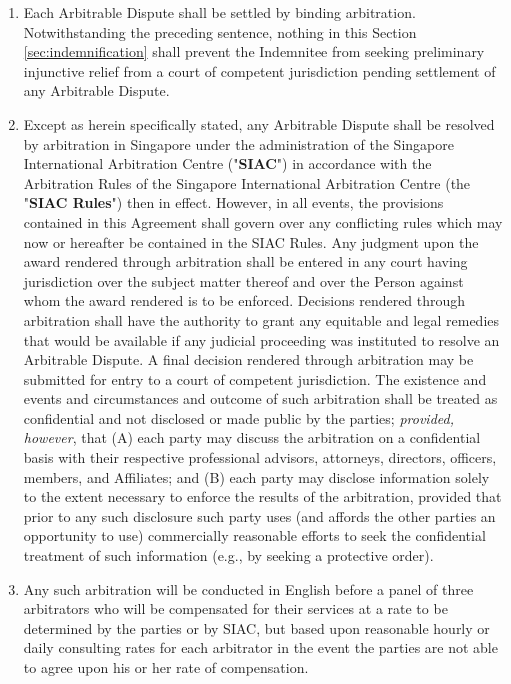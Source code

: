 \documentclass{article}
\begin{document}
\begin{enumerate}
\begin{enumerate}
              \item Each Arbitrable Dispute shall be settled by binding arbitration. Notwithstanding the preceding sentence, nothing in this Section \ref{sec:indemnification} shall prevent the Indemnitee from seeking preliminary injunctive relief from a court of competent jurisdiction pending settlement of any Arbitrable Dispute.

              \item Except as herein specifically stated, any Arbitrable Dispute shall be resolved by arbitration in Singapore under the administration of the Singapore International Arbitration Centre ("\textbf{SIAC}") in accordance with the Arbitration Rules of the Singapore International Arbitration Centre (the "\textbf{SIAC Rules}") then in effect. However, in all events, the provisions contained in this Agreement shall govern over any conflicting rules which may now or hereafter be contained in the SIAC Rules. Any judgment upon the award rendered through arbitration shall be entered in any court having jurisdiction over the subject matter thereof and over the Person against whom the award rendered is to be enforced. Decisions rendered through arbitration shall have the authority to grant any equitable and legal remedies that would be available if any judicial proceeding was instituted to resolve an Arbitrable Dispute. A final decision rendered through arbitration may be submitted for entry to a court of competent jurisdiction. The existence and events and circumstances and outcome of such arbitration shall be treated as confidential and not disclosed or made public by the parties; \textit{provided, however}, that (A) each party may discuss the arbitration on a confidential basis with their respective professional advisors, attorneys, directors, officers, members, and Affiliates; and (B) each party may disclose information solely to the extent necessary to enforce the results of the arbitration, provided that prior to any such disclosure such party uses (and affords the other parties an opportunity to use) commercially reasonable efforts to seek the confidential treatment of such information (e.g., by seeking a protective order).

              \item Any such arbitration will be conducted in English before a panel of three arbitrators who will be compensated for their services at a rate to be determined by the parties or by SIAC, but based upon reasonable hourly or daily consulting rates for each arbitrator in the event the parties are not able to agree upon his or her rate of compensation.


\end{enumerate}
\end{enumerate}
\end{document}
